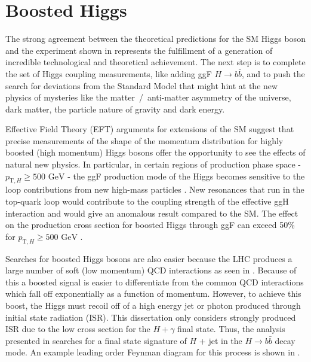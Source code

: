 \section{Boosted Higgs} \label{sec:higgs:boosted}

The strong agreement between the theoretical predictions for the SM Higgs boson
and the experiment shown in  represents the
fulfillment of a generation of incredible technological and theoretical
achievement.  The next step is to complete the set of Higgs coupling
measurements, like adding ggF $H \rightarrow b\bar{b}$, and to push the search
for deviations from the Standard Model that might hint at the new physics of
mysteries like the matter~/~anti-matter asymmetry of the universe, dark matter,
the particle nature of gravity and dark energy. 

Effective Field Theory (EFT) arguments for extensions of the SM suggest that precise
measurements of the shape of the momentum distribution for highly boosted (high
momentum) Higgs bosons offer the opportunity to see the effects of natural new
physics.  In particular, in certain regions of production phase space -
$p_{\text{T},H} \geq \text{500 GeV}$ - the ggF production mode of the Higgs
becomes sensitive to the loop contributions from new high-mass particles
\cite{Schlaffer:2014osa}.  New resonances that run in the top-quark loop would
contribute to the coupling strength of the effective ggH interaction and would
give an anomalous result compared to the SM. The effect on the production cross
section for boosted Higgs through ggF can exceed 50\% for $p_{\text{T},H} \geq
\text{500 GeV}$ \cite{Schlaffer:2014osa,Grojean:2013nya,Dawson:2015gka}.

Searches for boosted Higgs bosons are also easier because the LHC produces a
large number of soft (low momentum) QCD interactions as seen in
.  Because of this a boosted signal is easier
to differentiate from the common QCD interactions which fall off exponentially
as a function of momentum.  However, to achieve this boost, the Higgs must
recoil off of a high energy jet or photon \cite{Aaboud:2018zba} produced
through initial state radiation (ISR). This dissertation only considers
strongly produced ISR due to the low cross section for the $H + \gamma$ final
state.  Thus, the analysis presented in  searches for a final
state signature of $H$ + jet in the $H \rightarrow b\bar{b}$ decay mode.  An
example leading order Feynman diagram for this process is shown in
.

